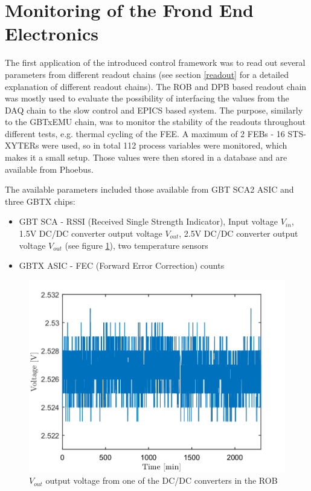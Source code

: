 \section{Monitoring of the Frond End Electronics}
The first application of the introduced control framework was to read out several parameters from different readout chains (see section \ref{readout} for a detailed explanation of different readout chains). The \gls{ROB} and \gls{DPB} based readout chain was mostly used to evaluate the possibility of interfacing the values from the \gls{DAQ} chain to the slow control and \gls{EPICS} based system. The purpose, similarly to the GBTxEMU chain, was to monitor the stability of the readouts throughout different tests, e.g. thermal cycling of the \gls{FEE}. A maximum of 2 FEBs - 16 STS-XYTERs were used, so in total 112 process variables were monitored, which makes it a small setup. Those values were then stored in a database and are available from Phoebus. 

The available parameters included those available from \gls{GBT} \gls{SCA2} \gls{ASIC} \cite{GBT_SCA_ASIC} and three GBTX chips: 
\begin{itemize}
    \item GBT SCA - RSSI (Received Single Strength Indicator), Input voltage $V_{in}$, 1.5V DC/DC converter output voltage $V_{out}$, 2.5V DC/DC converter output voltage $V_{out}$ (see figure \ref{fig:ROB}), two temperature sensors
    \item GBTX \gls{ASIC} - FEC (Forward Error Correction) counts
\end{itemize}

\begin{figure}[!h]
    \centering
    \includegraphics[width=0.65\columnwidth]{Chapter3/FEE/images/ROB.png}
    \caption{$V_{out}$ output voltage from one of the DC/DC converters in the \gls{ROB}}
    \label{fig:ROB}
\end{figure}

